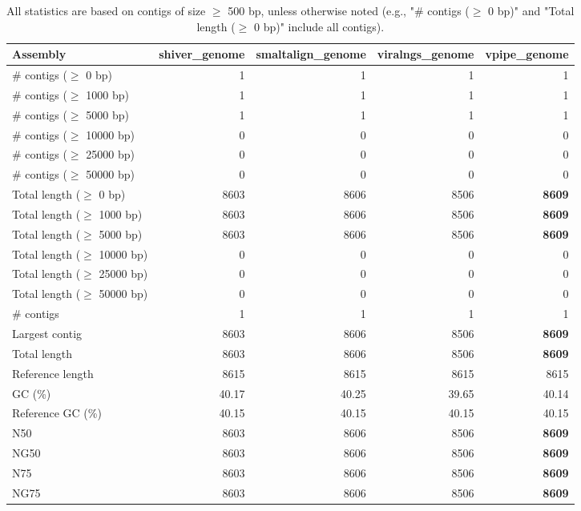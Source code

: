 \documentclass[12pt,a4paper]{article}
\begin{document}
\begin{table}[ht]
\begin{center}
\caption{All statistics are based on contigs of size $\geq$ 500 bp, unless otherwise noted (e.g., "\# contigs ($\geq$ 0 bp)" and "Total length ($\geq$ 0 bp)" include all contigs).}
\begin{tabular}{|l*{4}{|r}|}
\hline
Assembly & shiver\_genome & smaltalign\_genome & viralngs\_genome & vpipe\_genome \\ \hline
\# contigs ($\geq$ 0 bp) & 1 & 1 & 1 & 1 \\ \hline
\# contigs ($\geq$ 1000 bp) & 1 & 1 & 1 & 1 \\ \hline
\# contigs ($\geq$ 5000 bp) & 1 & 1 & 1 & 1 \\ \hline
\# contigs ($\geq$ 10000 bp) & 0 & 0 & 0 & 0 \\ \hline
\# contigs ($\geq$ 25000 bp) & 0 & 0 & 0 & 0 \\ \hline
\# contigs ($\geq$ 50000 bp) & 0 & 0 & 0 & 0 \\ \hline
Total length ($\geq$ 0 bp) & 8603 & 8606 & 8506 & {\bf 8609} \\ \hline
Total length ($\geq$ 1000 bp) & 8603 & 8606 & 8506 & {\bf 8609} \\ \hline
Total length ($\geq$ 5000 bp) & 8603 & 8606 & 8506 & {\bf 8609} \\ \hline
Total length ($\geq$ 10000 bp) & 0 & 0 & 0 & 0 \\ \hline
Total length ($\geq$ 25000 bp) & 0 & 0 & 0 & 0 \\ \hline
Total length ($\geq$ 50000 bp) & 0 & 0 & 0 & 0 \\ \hline
\# contigs & 1 & 1 & 1 & 1 \\ \hline
Largest contig & 8603 & 8606 & 8506 & {\bf 8609} \\ \hline
Total length & 8603 & 8606 & 8506 & {\bf 8609} \\ \hline
Reference length & 8615 & 8615 & 8615 & 8615 \\ \hline
GC (\%) & 40.17 & 40.25 & 39.65 & 40.14 \\ \hline
Reference GC (\%) & 40.15 & 40.15 & 40.15 & 40.15 \\ \hline
N50 & 8603 & 8606 & 8506 & {\bf 8609} \\ \hline
NG50 & 8603 & 8606 & 8506 & {\bf 8609} \\ \hline
N75 & 8603 & 8606 & 8506 & {\bf 8609} \\ \hline
NG75 & 8603 & 8606 & 8506 & {\bf 8609} \\ \hline

\end{tabular}
\end{center}
\end{table}
\end{document}
